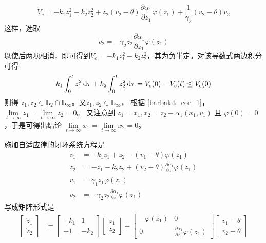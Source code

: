 \[ \dot{V}_c = - k_1 z^2_1 - k_2 z^2_2 + z_2 (v_2 - \theta) \frac{\partial
   \alpha_1}{\partial z_1} \varphi (z_1) + \frac{1}{\gamma_2} (v_2 - \theta)
   \dot{v}_2 \]
这样，选取\[\dot{v}_2 = - \gamma_2 z_2 \frac{\partial \alpha_1}{\partial z_1}
\varphi (z_1)\]以使后两项相消，即可得到$\dot{V}_c = - k_1 z^2_1 - k_2 z^2_2$，其为负半定。对该导数式两边积分可得
\[ k_1 \int^t_0 z^2_1 \mathop{}\!\mathrm{d} \tau + k_2 \int^t_0 z^2_2 \mathop{}\!\mathrm{d} \tau = V_c (0) - V_c (t)  \leq V_c (0) \]
则得 $z_1, z_2 \in \mathbf{L}_2 \cap \mathbf{L}_{\infty}$。又$\dot{z}_1,
\dot{z}_2 \in \mathbf{L}_{\infty}$，
根据 \ref{barbalat_cor_1}，$\lim\limits_{t \rightarrow \infty} z_1 = \lim\limits_{t \rightarrow
\infty} z_2 = 0$。
又注意到 $z_1 = x_1, x_2 = z_2 - \alpha_1 (x_1, v_1)$ 且 $\varphi (0) = 0$，于是可得出结论 $\lim\limits_{t \rightarrow \infty} x_1 = \lim\limits_{t \rightarrow \infty} x_2 = 0$。
\begin{note}
    施加自适应律的闭环系统方程是
\begin{align*}
  \dot{z}_1 & = - k_1 z_1 + z_2 - (v_1 - \theta) \varphi (z_1)\\
  \dot{z}_2 & = - z_1 - k_2 z_2 + (v_2 - \theta) \frac{\partial
  \alpha_1}{\partial z_1} \varphi (z_1)\\
  \dot{v}_1 & = \gamma_1 z_1 \varphi (z_1)\\
  \dot{v}_2 & = - \gamma_2 z_2 \frac{\partial \alpha_1}{\partial z_1}
  \varphi (z_1)
\end{align*}
写成矩阵形式是
\begin{align*}
  \left[\begin{array}{c}
    \dot{z}_1\\
    \dot{z}_2
  \end{array}\right] & = \left[\begin{array}{cc}
    - k_1 & 1\\
    - 1 & - k_2
  \end{array}\right] \left[\begin{array}{c}
    z_1\\
    z_2
  \end{array}\right] + \left[\begin{array}{cc}
    - \varphi (z_1) & 0\\
    0 & \frac{\partial \alpha_1}{\partial z_1} \varphi (z_1)
  \end{array}\right] \left[\begin{array}{c}
    v_1 - \theta\\
    v_2 - \theta
  \end{array}\right]\\

\end{align*}
\end{note}

